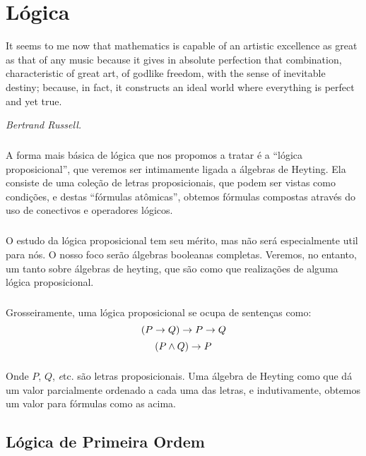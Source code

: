 \chapter{Lógica}
    \epigraph{\justify
        It seems to me now that mathematics 
        is capable of an artistic excellence 
        as great as that of any music 
        \elide because it gives in absolute 
        perfection that combination, 
        characteristic of great art, of godlike 
        freedom, with the sense of inevitable 
        destiny; because, in fact, it constructs 
        an ideal world where everything is 
        perfect and yet true.
        }{\textit{Bertrand Russell.}}    
    \cls
    \paragraph{}
        A forma mais básica de lógica que nos propomos
        a tratar é a ``lógica proposicional'', que 
        veremos ser intimamente ligada a álgebras de
        Heyting. Ela consiste de uma coleção de letras
        proposicionais, que podem ser vistas como 
        condições, e destas ``fórmulas atômicas'', 
        obtemos fórmulas compostas através do uso de 
        conectivos e operadores lógicos.
    \paragraph{}
        O estudo da lógica proposicional tem seu 
        mérito, mas não será especialmente util para
        nós. O nosso foco serão álgebras booleanas 
        completas. Veremos, no entanto, um tanto sobre
        álgebras de heyting, que são como que realizações 
        de alguma lógica proposicional.
    \paragraph{}
        Grosseiramente, uma lógica proposicional se ocupa
        de sentenças como:
        $$(P\rightarrow Q)\rightarrow P\rightarrow Q$$
        $$(P\land Q)\rightarrow P$$
    \paragraph{}
        Onde $P$, $Q$, {\emph etc.} são letras 
        proposicionais. Uma álgebra de Heyting 
        como que dá um valor parcialmente ordenado
        a cada uma das letras, e indutivamente, 
        obtemos um valor para fórmulas como as 
        acima.

    \section{Lógica de Primeira Ordem}

